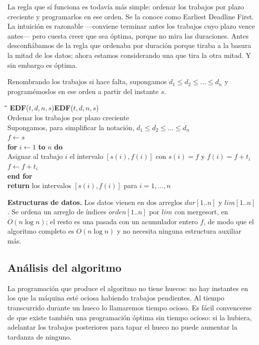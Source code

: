 \documentclass[12pt, spanish, oneside, openany]{book}
\newcommand{\pl}[1]{\makebox[1.6em][r]{\texttt{\footnotesize #1}}\hspace{0.9em}}
\newenvironment{pseudo}[1]{%
  \begin{center}%
  \begin{mdframed}[style=pseudobox]%
  \small
  \begin{tabbing}%
  \hspace{2.5em}\=\hspace{1.5em}\=\hspace{1.5em}\=\hspace{1.5em}\=\hspace{1.5em}\=\kill
  \def\pseudotitulo{#1}\ifx\pseudotitulo\empty\else#1\\[3pt]\fi}%
  {\end{tabbing}\end{mdframed}\end{center}}
\newenvironment{estructuras}%
  {\begin{center}\begin{minipage}{0.93\textwidth}\begin{mdframed}[style=estrbox]%
   \small\textbf{Estructuras de datos.}\;}%
  {\end{mdframed}\end{minipage}\end{center}}
\theoremstyle{uprightplain}
\theoremstyle{definition}
\theoremstyle{remark}
\theoremstyle{definition}
\begin{document}
La regla que sí funciona es todavía más simple: ordenar los trabajos por plazo creciente y programarlos en ese orden. Se la conoce como Earliest Deadline First. La intuición es razonable ---conviene terminar antes los trabajos cuyo plazo vence antes--- pero cuesta creer que sea óptima, porque no mira las duraciones. Antes desconfiábamos de la regla que ordenaba por duración porque tiraba a la basura la mitad de los datos; ahora estamos considerando una que tira la otra mitad. Y sin embargo es óptima.

Renombrando los trabajos si hace falta, supongamos $d_1 \le d_2 \le \dots \le d_n$ y programémoslos en ese orden a partir del instante $s$.

\begin{pseudo}{\textbf{EDF}($t,d,n,s$)}
\pl{1}\> Ordenar los trabajos por plazo creciente\\
\pl{2}\> Supongamos, para simplificar la notación, $d_1 \le d_2 \le \dots \le d_n$\\
\pl{3}\> $f \leftarrow s$\\
\pl{4}\> \textbf{for} $i \leftarrow 1$ \textbf{to} $n$ \textbf{do}\\
\pl{5}\>\> Asignar al trabajo $i$ el intervalo $[s(i),f(i)]$ con $s(i)=f$ y $f(i)=f+t_i$\\
\pl{6}\>\> $f \leftarrow f + t_i$\\
\pl{7}\> \textbf{end for}\\
\pl{8}\> \textbf{return} los intervalos $[s(i),f(i)]$ para $i=1,\dots,n$
\end{pseudo}

\begin{estructuras}
Los datos vienen en dos arreglos $\mathit{dur}[1..n]$ y $\mathit{lim}[1..n]$.
Se ordena un arreglo de índices $\mathit{orden}[1..n]$ por $\mathit{lim}$ con
mergesort, en $O(n\log n)$; el resto es una pasada con un acumulador entero
$f$, de modo que el algoritmo completo es $O(n\log n)$ y no necesita ninguna
estructura auxiliar más.
\end{estructuras}

\subsection{Análisis del algoritmo}

La programación que produce el algoritmo no tiene huecos: no hay instantes en los que la máquina esté ociosa habiendo trabajos pendientes. Al tiempo transcurrido durante un hueco lo llamaremos tiempo ocioso. Es fácil convencerse de que existe también una programación óptima sin tiempo ocioso: si la hubiera, adelantar los trabajos posteriores para tapar el hueco no puede aumentar la tardanza de ninguno.
\end{document}
